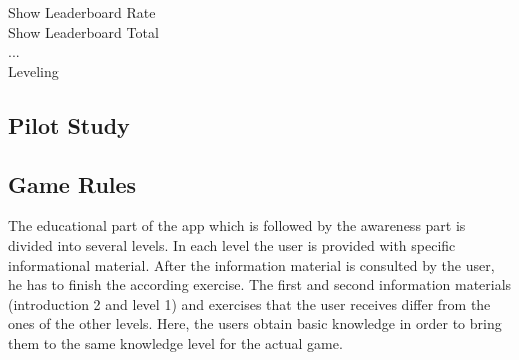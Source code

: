 \begin{description}
	\item[Show Leaderboard Rate]
	\item[Show Leaderboard Total]
	\item[...]
	\item[Leveling]
\end{description}

\subsection{Pilot Study}
\subsection{Game Rules}
The educational part of the app which is followed by the awareness part is divided into several levels.
 In each level the user is provided with specific informational material.
 After the information material is consulted by the user, he has to finish the according exercise.
The first  and second information materials (introduction 2 and level 1) and exercises that the user receives differ from the ones of the other levels. Here, the users obtain basic knowledge in order to bring them to the same knowledge level for the actual game.
 
